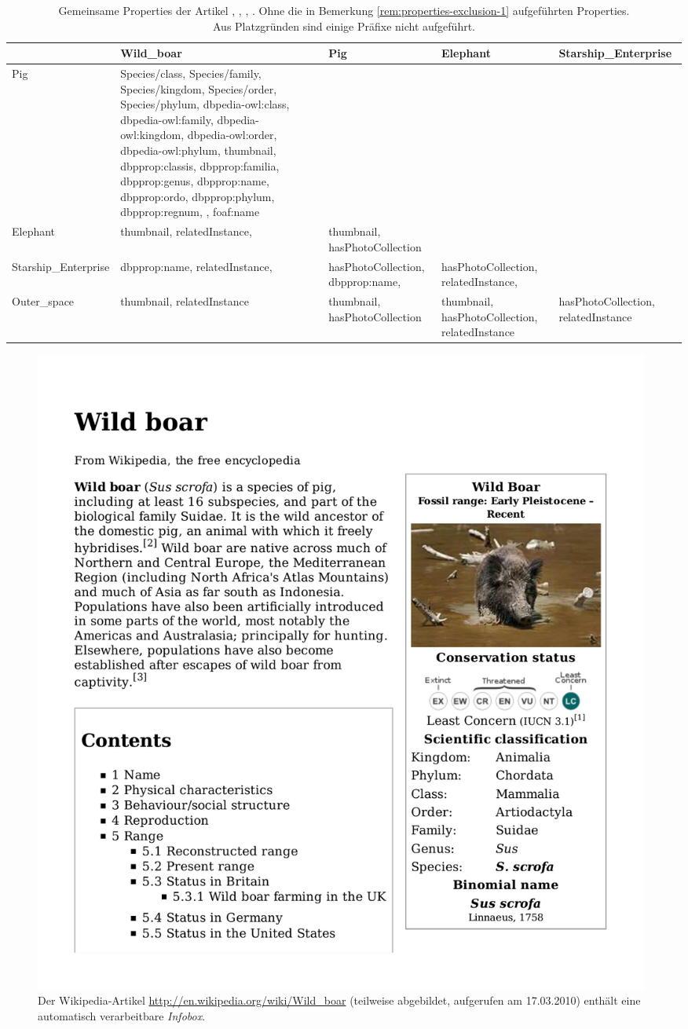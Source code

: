 \begin{table}
\footnotesize
\begin{tabular}{lp{4cm}p{4cm}p{4cm}p{4cm}}
\toprule
~	&Wild\_boar	&Pig	&Elephant	&Starship\_Enterprise\\
\midrule
Pig	&Species/class, Species/family, Species/kingdom, Species/order, Species/phylum, dbpedia-owl:class, dbpedia-owl:family, dbpedia-owl:kingdom, dbpedia-owl:order, dbpedia-owl:phylum, thumbnail, dbpprop:classis, dbpprop:familia, dbpprop:genus, dbpprop:name, dbpprop:ordo, dbpprop:phylum, dbpprop:regnum, , foaf:name	&	&	&\\
\midrule
Elephant	&thumbnail, relatedInstance, 	&thumbnail, hasPhotoCollection	&	&\\
\midrule
Starship\_Enterprise	&dbpprop:name, relatedInstance, 	&hasPhotoCollection, dbpprop:name, 	&hasPhotoCollection, relatedInstance, 	&\\
\midrule
Outer\_space	&thumbnail, relatedInstance	&thumbnail, hasPhotoCollection	&thumbnail, hasPhotoCollection, relatedInstance	&hasPhotoCollection, relatedInstance\\
\bottomrule
\end{tabular}
\caption[]{
Gemeinsame Properties der Artikel , , , . Ohne die in Bemerkung \ref{rem:properties-exclusion-1} aufgeführten Properties.\\
Aus Platzgründen sind einige Präfixe nicht aufgeführt.
}
\label{tab:properties-intersection}
\end{table}

\begin{figure}[tbh]
\includegraphics[width=0.99\textwidth]{img/pdf/wild_boar_wikipedia.pdf}
\caption[]{Der Wikipedia-Artikel \url{http://en.wikipedia.org/wiki/Wild_boar} (teilweise abgebildet, aufgerufen am 17.03.2010) enthält eine automatisch verarbeitbare \emph{Infobox}.}
\label{fig:wikipedia-wild_boar}
\end{figure}

